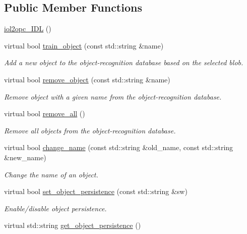 \subsection*{Public Member Functions}
\begin{DoxyCompactItemize}
\item 
\hyperlink{classiol2opc__IDL_ac05579cbbff611ecb48b422b1dc3c8bb}{iol2opc\+\_\+\+I\+DL} ()
\item 
virtual bool \hyperlink{classiol2opc__IDL_a6215d1e2e1865dcf4584e925b8c1d1be}{train\+\_\+object} (const std\+::string \&name)
\begin{DoxyCompactList}\small\item\em Add a new object to the object-\/recognition database based on the selected blob. \end{DoxyCompactList}\item 
virtual bool \hyperlink{classiol2opc__IDL_a69ecef7b79d9f59b9db91e4471627cb5}{remove\+\_\+object} (const std\+::string \&name)
\begin{DoxyCompactList}\small\item\em Remove object with a given name from the object-\/recognition database. \end{DoxyCompactList}\item 
virtual bool \hyperlink{classiol2opc__IDL_a1b773df105805332a143614903ae6370}{remove\+\_\+all} ()
\begin{DoxyCompactList}\small\item\em Remove all objects from the object-\/recognition database. \end{DoxyCompactList}\item 
virtual bool \hyperlink{classiol2opc__IDL_a18ecf43816b0df1187a208df18fb98a7}{change\+\_\+name} (const std\+::string \&old\+\_\+name, const std\+::string \&new\+\_\+name)
\begin{DoxyCompactList}\small\item\em Change the name of an object. \end{DoxyCompactList}\item 
virtual bool \hyperlink{classiol2opc__IDL_a8973d954812064a1662acaaa434947e7}{set\+\_\+object\+\_\+persistence} (const std\+::string \&sw)
\begin{DoxyCompactList}\small\item\em Enable/disable object persistence. \end{DoxyCompactList}\item 
virtual std\+::string \hyperlink{classiol2opc__IDL_a51b8e076770a618ef676dd2ccdf4b35a}{get\+\_\+object\+\_\+persistence} ()

\end{DoxyCompactItemize}
